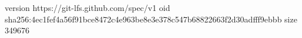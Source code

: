 version https://git-lfs.github.com/spec/v1
oid sha256:4ec1fef4a56f91bce8472c4e963be8e3e378c547b68822663f2d30adfff9ebbb
size 349676
